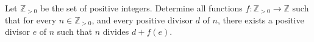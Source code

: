 Let $\mathbb{Z}_{>0}$ be the set of positive integers. Determine all functions $f:\mathbb{Z}_{>0}\to\mathbb{Z}$ such that for every $n\in\mathbb{Z}_{>0}$, and every positive divisor $d$ of $n$, there exists a positive divisor $e$ of $n$ such that $n$ divides $d+f(e)$.
